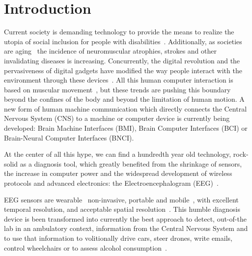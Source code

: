 \documentclass[brainsci,article,submit,moreauthors,pdftex,10pt,a4paper]{mdpi}
\begin{document}

\setcounter{section}{-1} %

\section{Introduction}






Current society is demanding technology to provide the means to realize the utopia of social inclusion for people with disabilities~\citep{Wolpaw2002}.  Additionally, as societies are aging~\citep{Lutz2008} the incidence of neuromuscular atrophies, strokes and other invalidating diseases is increasing.  Concurrently, the digital revolution and the pervasiveness of digital gadgets have modified the way people interact with the environment through these devices~\citep{Domingo2012}.  All this human computer interaction is based on muscular movement~\citep{Guger2017}, but these trends are pushing this boundary beyond the confines of the body and beyond the limitation of human motion.  A new form of human machine communication which directly connects the Central Nervous System (CNS) to a machine or computer device is currently being developed: Brain Machine Interfaces (BMI), Brain Computer Interfaces (BCI) or Brain-Neural Computer Interfaces (BNCI).

At the center of all this hype, we can find a hundredth year old technology, rock-solid as a diagnosis tool, which greatly benefited from the shrinkage of sensors, the increase in computer power and the widespread development of wireless protocols and advanced electronics: the Electroencephalogram (EEG)~\citep{Schomer2010}.

EEG sensors are wearable~\citep{Puce2017} non-invasive, portable and mobile~\citep{DeVos2014}, with excellent temporal resolution, and acceptable spatial resolution~\citep{Hartman2005}.  This humble diagnosis device is been transformed into currently the best approach to detect, out-of-the lab in an ambulatory context, information from the Central Nervous System and to use that information to volitionally drive cars, steer drones, write emails, control wheelchairs or to assess alcohol consumption~\citep{Yuste2017,KevricJasmin2016,Tzimourta2018,Cruz2018}.
\end{document}
